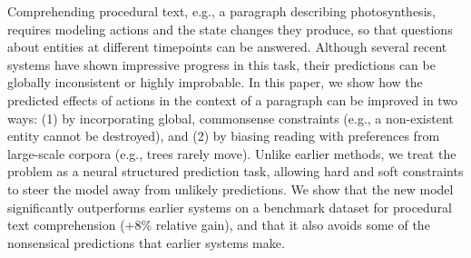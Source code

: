 Comprehending procedural text, e.g., a paragraph describing photosynthesis, requires modeling actions and the state changes they produce, so that questions about entities at different timepoints can be answered. Although several recent systems have shown impressive progress in this task, their predictions can be globally inconsistent or highly improbable. In this paper, we show how the predicted effects of actions in the context of a paragraph can be improved in two ways: (1) by incorporating global, commonsense constraints (e.g., a non-existent entity cannot be destroyed), and (2) by biasing reading with preferences from large-scale corpora (e.g., trees rarely move). Unlike earlier methods, we treat the problem as a neural structured prediction task, allowing hard and soft constraints to steer the model away from unlikely predictions. We show that the new model significantly outperforms earlier systems on a benchmark dataset for procedural text comprehension (+8\% relative gain), and that it also avoids some of the nonsensical predictions that earlier systems make.
